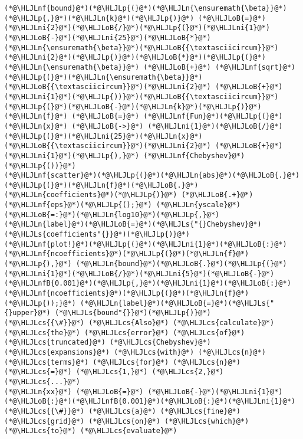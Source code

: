 \documentclass[12pt,a4paper]{article}
\newcommand{\HLJLn}[1]{#1}
\newcommand{\HLJLnf}[1]{\textcolor[RGB]{66,102,213}{#1}}
\newcommand{\HLJLs}[1]{\textcolor[RGB]{201,61,57}{#1}}
\newcommand{\HLJLnfB}[1]{\textcolor[RGB]{59,151,46}{#1}}
\newcommand{\HLJLni}[1]{\textcolor[RGB]{59,151,46}{#1}}
\newcommand{\HLJLoB}[1]{\textcolor[RGB]{102,102,102}{\textbf{#1}}}
\newcommand{\HLJLp}[1]{#1}
\newcommand{\HLJLcs}[1]{\textcolor[RGB]{153,153,119}{\textit{#1}}}
\begin{document}
\begin{lstlisting}
(*@\HLJLnf{bound}@*)(*@\HLJLp{(}@*)(*@\HLJLn{\ensuremath{\beta}}@*)(*@\HLJLp{,}@*)(*@\HLJLn{k}@*)(*@\HLJLp{)}@*) (*@\HLJLoB{=}@*) (*@\HLJLni{2}@*)(*@\HLJLoB{/}@*)(*@\HLJLp{(}@*)(*@\HLJLni{1}@*)(*@\HLJLoB{-}@*)(*@\HLJLni{25}@*)(*@\HLJLoB{*}@*)(*@\HLJLn{\ensuremath{\beta}}@*)(*@\HLJLoB{{\textasciicircum}}@*)(*@\HLJLni{2}@*)(*@\HLJLp{)}@*)(*@\HLJLoB{*}@*)(*@\HLJLp{(}@*)(*@\HLJLn{\ensuremath{\beta}}@*) (*@\HLJLoB{+}@*) (*@\HLJLnf{sqrt}@*)(*@\HLJLp{(}@*)(*@\HLJLn{\ensuremath{\beta}}@*)(*@\HLJLoB{{\textasciicircum}}@*)(*@\HLJLni{2}@*) (*@\HLJLoB{+}@*) (*@\HLJLni{1}@*)(*@\HLJLp{))}@*)(*@\HLJLoB{{\textasciicircum}}@*)(*@\HLJLp{(}@*)(*@\HLJLoB{-}@*)(*@\HLJLn{k}@*)(*@\HLJLp{)}@*)
(*@\HLJLn{f}@*) (*@\HLJLoB{=}@*) (*@\HLJLnf{Fun}@*)(*@\HLJLp{(}@*) (*@\HLJLn{x}@*) (*@\HLJLoB{->}@*) (*@\HLJLni{1}@*)(*@\HLJLoB{/}@*)(*@\HLJLp{(}@*)(*@\HLJLni{25}@*)(*@\HLJLn{x}@*)(*@\HLJLoB{{\textasciicircum}}@*)(*@\HLJLni{2}@*) (*@\HLJLoB{+}@*) (*@\HLJLni{1}@*)(*@\HLJLp{),}@*) (*@\HLJLnf{Chebyshev}@*)(*@\HLJLp{())}@*)
(*@\HLJLnf{scatter}@*)(*@\HLJLp{(}@*)(*@\HLJLn{abs}@*)(*@\HLJLoB{.}@*)(*@\HLJLp{(}@*)(*@\HLJLn{f}@*)(*@\HLJLoB{.}@*)(*@\HLJLn{coefficients}@*)(*@\HLJLp{)}@*) (*@\HLJLoB{.+}@*) (*@\HLJLnf{eps}@*)(*@\HLJLp{();}@*) (*@\HLJLn{yscale}@*)(*@\HLJLoB{=:}@*)(*@\HLJLn{log10}@*)(*@\HLJLp{,}@*) (*@\HLJLn{label}@*)(*@\HLJLoB{=}@*)(*@\HLJLs{"{}Chebyshev}@*) (*@\HLJLs{coefficients"{}}@*)(*@\HLJLp{)}@*)
(*@\HLJLnf{plot!}@*)(*@\HLJLp{(}@*)(*@\HLJLni{1}@*)(*@\HLJLoB{:}@*)(*@\HLJLnf{ncoefficients}@*)(*@\HLJLp{(}@*)(*@\HLJLn{f}@*)(*@\HLJLp{),}@*) (*@\HLJLn{bound}@*)(*@\HLJLoB{.}@*)(*@\HLJLp{(}@*)(*@\HLJLni{1}@*)(*@\HLJLoB{/}@*)(*@\HLJLni{5}@*)(*@\HLJLoB{-}@*)(*@\HLJLnfB{0.001}@*)(*@\HLJLp{,}@*)(*@\HLJLni{1}@*)(*@\HLJLoB{:}@*)(*@\HLJLnf{ncoefficients}@*)(*@\HLJLp{(}@*)(*@\HLJLn{f}@*)(*@\HLJLp{));}@*) (*@\HLJLn{label}@*)(*@\HLJLoB{=}@*)(*@\HLJLs{"{}upper}@*) (*@\HLJLs{bound"{}}@*)(*@\HLJLp{)}@*)
(*@\HLJLcs{{\#}}@*) (*@\HLJLcs{Also}@*) (*@\HLJLcs{calculate}@*) (*@\HLJLcs{the}@*) (*@\HLJLcs{error}@*) (*@\HLJLcs{of}@*) (*@\HLJLcs{truncated}@*) (*@\HLJLcs{Chebyshev}@*) (*@\HLJLcs{expansions}@*) (*@\HLJLcs{with}@*) (*@\HLJLcs{n}@*) (*@\HLJLcs{terms}@*) (*@\HLJLcs{for}@*) (*@\HLJLcs{n}@*) (*@\HLJLcs{=}@*) (*@\HLJLcs{1,}@*) (*@\HLJLcs{2,}@*) (*@\HLJLcs{...}@*)
(*@\HLJLn{xx}@*) (*@\HLJLoB{=}@*) (*@\HLJLoB{-}@*)(*@\HLJLni{1}@*)(*@\HLJLoB{:}@*)(*@\HLJLnfB{0.001}@*)(*@\HLJLoB{:}@*)(*@\HLJLni{1}@*) (*@\HLJLcs{{\#}}@*) (*@\HLJLcs{a}@*) (*@\HLJLcs{fine}@*) (*@\HLJLcs{grid}@*) (*@\HLJLcs{on}@*) (*@\HLJLcs{which}@*) (*@\HLJLcs{to}@*) (*@\HLJLcs{evaluate}@*)

\end{lstlisting}
\end{document}
